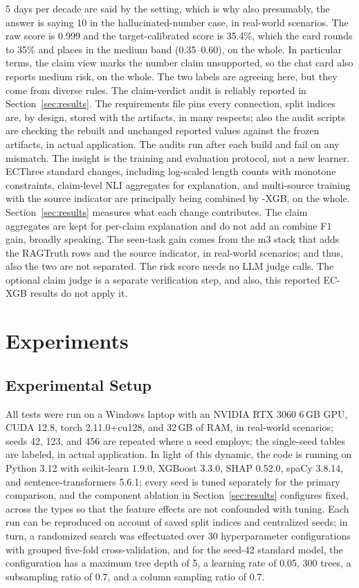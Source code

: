 \documentclass[a4paper,fleqn]{cas-sc}
\begin{document}
5 days per decade are said by the setting, which is why also presumably, the answer is saying 10 in the hallucinated-number case, in real-world scenarios. The raw score is 0.999 and the target-calibrated score is 35.4\%, which the card rounds to 35\% and places in the medium band (0.35--0.60), on the whole. In particular terms, the claim view marks the number claim unsupported, so the chat card also reports medium risk, on the whole. The two labels are agreeing here, but they come from diverse rules. The claim-verdict audit is reliably reported in Section~\ref{sec:results}. The requirements file pins every connection, split indices are, by design, stored with the artifacts, in many respects; also the audit scripts are checking the rebuilt and unchanged reported values against the frozen artifacts, in actual application. The audits run after each build and fail on any mismatch. The insight is the training and evaluation protocol, not a new learner. ECThree standard changes, including log-scaled length counts with monotone constraints, claim-level NLI aggregates for explanation, and multi-source training with the source indicator are principally being combined by -XGB, on the whole. Section~\ref{sec:results} measures what each change contributes. The claim aggregates are kept for per-claim explanation and do not add an combine F1 gain, broadly speaking. The seen-task gain comes from the m3 stack that adds the RAGTruth rows and the source indicator, in real-world scenarios; and thus, also the two are not separated. The risk score needs no LLM judge calls. The optional claim judge is a separate verification step, and also, this reported EC-XGB results do not apply it.

\section{Experiments}\label{sec:experiment}

\subsection{Experimental Setup}

All tests were run on a Windows laptop with an NVIDIA RTX 3060 6\,GB GPU, CUDA 12.8, torch 2.11.0+cu128, and 32\,GB of RAM, in real-world scenarios; seeds 42, 123, and 456 are repeated where a seed employs; the single-seed tables are labeled, in actual application. In light of this dynamic, the code is running on Python 3.12 with scikit-learn 1.9.0, XGBoost 3.3.0, SHAP 0.52.0, spaCy 3.8.14, and sentence-transformers 5.6.1; every seed is tuned separately for the primary comparison, and the component ablation in Section~\ref{sec:results} configures fixed, across the types so that the feature effects are not confounded with tuning. Each run can be reproduced on account of saved split indices and centralized seeds; in turn, a randomized search was effectuated over 30 hyperparameter configurations with grouped five-fold cross-validation, and for the seed-42 standard model, the configuration has a maximum tree depth of 5, a learning rate of 0.05, 300 trees, a subsampling ratio of 0.7, and a column sampling ratio of 0.7.
\end{document}
